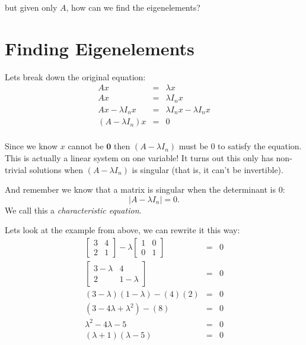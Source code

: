 but given only $A$, how can we find the eigenelements? 

\section{Finding Eigenelements}
Lets break down the original equation: 
\[\begin{array}{rcl}
Ax&=&\lambda x\\
Ax&=&\lambda I_n x\\
Ax-\lambda I_n x&=&\lambda I_n x-\lambda I_n x\\
(A-\lambda I_n)x & = & 0\\
\end{array}\]

Since we know $x$ cannot be $\mathbf{0}$ then $(A-\lambda I_n)$ must be 0 to satisfy the equation. 
This is actually a linear system on one variable!
It turns out this only has non-trivial solutions when $(A-\lambda I_n)$ is singular (that is, it can't be invertible). 

And remember we know that a matrix is singular when the determinant is $0$: 
 \[|A-\lambda I_n|=0.\]
We call this a \emph{characteristic equation}. 

Lets look at the example from above, 
we can rewrite it this way: 
\[\begin{array}{rcl}
\begin{bmatrix}3 & 4 \\ 2 & 1\end{bmatrix}-\lambda\begin{bmatrix}1&0\\0&1\end{bmatrix} & = & 0\\
\begin{bmatrix}3-\lambda & 4 \\ 2 & 1-\lambda\end{bmatrix} & = & 0\\
(3-\lambda)(1-\lambda)-(4)(2) & = & 0\\
(3-4\lambda+\lambda^2)-(8) & = & 0\\
\lambda^2-4\lambda-5 & = & 0\\
(\lambda+1)(\lambda - 5)  & = & 0\\
\end{array}\]

